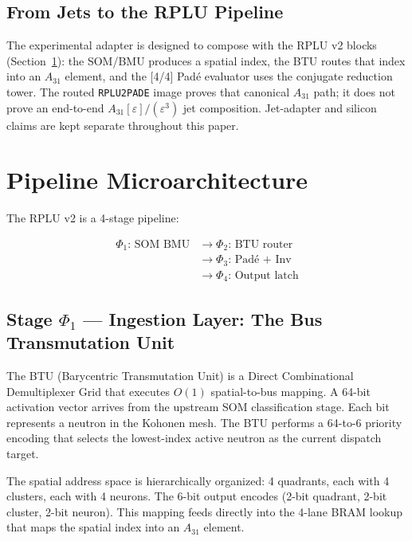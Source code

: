 \documentclass[conference]{IEEEtran}
\begin{document}
\subsection{From Jets to the RPLU Pipeline}

The experimental adapter is designed to compose with the RPLU v2 blocks
(Section~\ref{sec:microarch}): the SOM/BMU produces a spatial index, the BTU
routes that index into an $A_{31}$ element, and the [4/4] Pad\'{e} evaluator
uses the conjugate reduction tower. The routed \texttt{RPLU2PADE} image proves
that canonical $A_{31}$ path; it does not prove an end-to-end
$A_{31}[\varepsilon]/(\varepsilon^3)$ jet composition. Jet-adapter and silicon
claims are kept separate throughout this paper.


\section{Pipeline Microarchitecture}
\label{sec:microarch}

The RPLU v2 is a 4-stage pipeline:

\begin{equation}
\begin{aligned}
\Phi_1\text{: SOM BMU} &\rightarrow \Phi_2\text{: BTU router} \\
&\rightarrow \Phi_3\text{: Pad\'{e} + Inv} \\
&\rightarrow \Phi_4\text{: Output latch}
\end{aligned}
\end{equation}

\subsection{Stage $\Phi_1$ — Ingestion Layer: The Bus Transmutation Unit}

The BTU (Barycentric Transmutation Unit) is a Direct Combinational Demultiplexer
Grid that executes $O(1)$ spatial-to-bus mapping. A 64-bit activation
vector arrives from the upstream SOM classification stage. Each bit
represents a neutron in the Kohonen mesh. The BTU performs a 64-to-6
priority encoding that selects the lowest-index active neutron as the
current dispatch target.

The spatial address space is hierarchically organized: 4 quadrants, each
with 4 clusters, each with 4 neurons. The 6-bit output encodes (2-bit
quadrant, 2-bit cluster, 2-bit neuron). This mapping feeds directly into
the 4-lane BRAM lookup that maps the spatial index into an
$A_{31}$ element.
\end{document}
